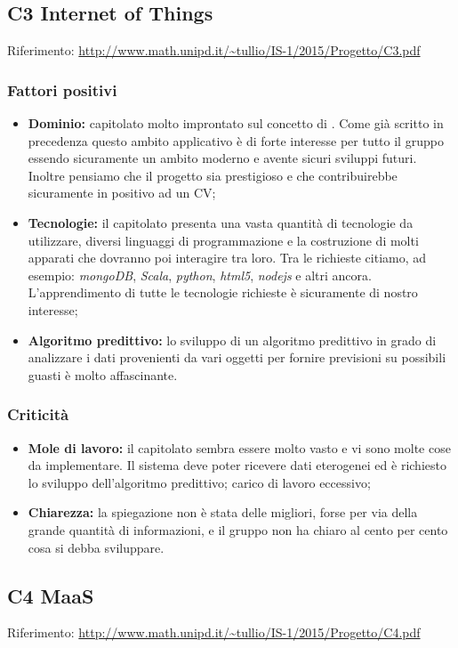 \documentclass{scalatekids-article}
\begin{document}
\subsection{C3 Internet of Things}
Riferimento: \url{http://www.math.unipd.it/~tullio/IS-1/2015/Progetto/C3.pdf}\\
\subsubsection{Fattori positivi}
\begin{itemize}
\item \textbf{Dominio:} capitolato molto improntato sul concetto di . 
Come già scritto in precedenza questo ambito applicativo è di forte interesse per tutto il gruppo essendo sicuramente un ambito moderno e avente sicuri sviluppi futuri. Inoltre pensiamo che il progetto sia prestigioso e che contribuirebbe sicuramente in positivo ad un CV;
\item \textbf{Tecnologie:} il capitolato presenta una vasta quantità di tecnologie da utilizzare, diversi linguaggi di programmazione e la costruzione di molti apparati che dovranno poi interagire tra loro.
Tra le richieste citiamo, ad esempio: \textit{mongoDB}, \textit{Scala}, \textit{python}, \textit{html5}, \textit{nodejs} e altri ancora. L'apprendimento di tutte le tecnologie richieste è sicuramente di nostro interesse;
\item \textbf{Algoritmo predittivo:} lo sviluppo di un algoritmo predittivo in grado di analizzare i dati provenienti da vari oggetti per fornire previsioni su possibili guasti è molto affascinante.
\end{itemize}
\subsubsection{Criticità}
\begin{itemize}
\item \textbf{Mole di lavoro:} il capitolato sembra essere molto vasto e vi sono molte cose da implementare.
Il sistema deve poter ricevere dati eterogenei ed è richiesto lo sviluppo dell'algoritmo predittivo; carico di lavoro eccessivo;
\item \textbf{Chiarezza:} la spiegazione non è stata delle migliori, forse per via della grande quantità di informazioni, e il gruppo non ha chiaro al cento per cento cosa si debba sviluppare.
\end{itemize}

\subsection{C4 MaaS}
Riferimento: \url{http://www.math.unipd.it/~tullio/IS-1/2015/Progetto/C4.pdf}\\
\end{document}
